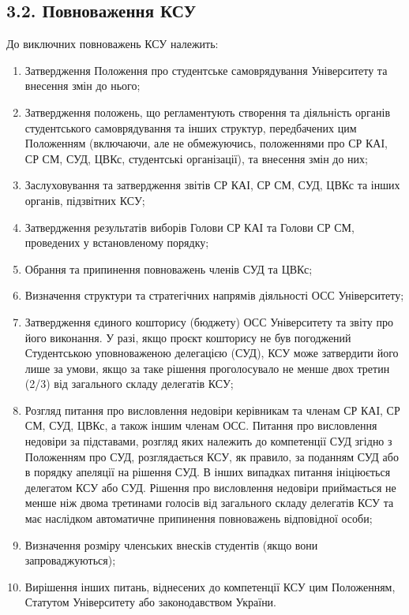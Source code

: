 \subsection*{3.2. Повноваження КСУ}
    До виключних повноважень КСУ належить:
        \begin{enumerate}[label=\alph*)]
            \item Затвердження Положення про студентське самоврядування Університету та внесення змін до нього;
            \item Затвердження положень, що регламентують створення та діяльність органів студентського самоврядування та інших структур, передбачених цим Положенням (включаючи, але не обмежуючись, положеннями про СР КАІ, СР СМ, СУД, ЦВКс, студентські організації), та внесення змін до них;
            \item Заслуховування та затвердження звітів СР КАІ, СР СМ, СУД, ЦВКс та інших органів, підзвітних КСУ;
            \item Затвердження результатів виборів Голови СР КАІ та Голови СР СМ, проведених у встановленому порядку;
            \item Обрання та припинення повноважень членів СУД та ЦВКс;
            \item Визначення структури та стратегічних напрямів діяльності ОСС Університету;
            \item Затвердження єдиного кошторису (бюджету) ОСС Університету та звіту про його виконання. У разі, якщо проєкт кошторису не був погоджений Студентською уповноваженою делегацією (СУД), КСУ може затвердити його лише за умови, якщо за таке рішення проголосувало не менше двох третин (2/3) від загального складу делегатів КСУ;
            \item Розгляд питання про висловлення недовіри керівникам та членам СР КАІ, СР СМ, СУД, ЦВКс, а також іншим членам ОСС. Питання про висловлення недовіри за підставами, розгляд яких належить до компетенції СУД згідно з Положенням про СУД, розглядається КСУ, як правило, за поданням СУД або в порядку апеляції на рішення СУД. В інших випадках питання ініціюється делегатом КСУ або СУД. Рішення про висловлення недовіри приймається не менше ніж двома третинами голосів від загального складу делегатів КСУ та має наслідком автоматичне припинення повноважень відповідної особи;
            \item Визначення розміру членських внесків студентів (якщо вони запроваджуються);
            \item Вирішення інших питань, віднесених до компетенції КСУ цим Положенням, Статутом Університету або законодавством України.
        \end{enumerate}


